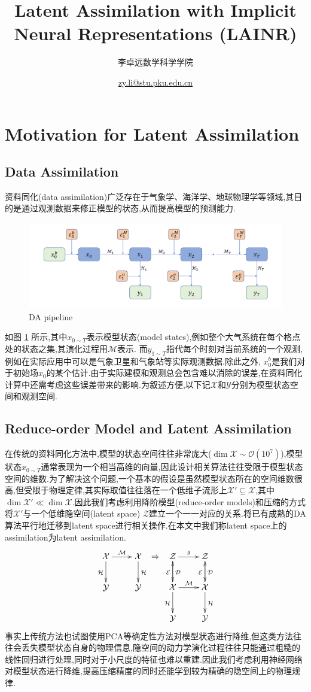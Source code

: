 \documentclass{article}
\title{Latent Assimilation with Implicit Neural Representations (LAINR)}
\author{李卓远\hspace*{5ex}数学科学学院}
\date{\href{mailto:zy.li@stu.pku.edu.cn}{zy.li@stu.pku.edu.cn}}
\newcommand{\mM}{\mathcal{M}}
\newcommand{\mH}{\mathcal{H}}
\newcommand{\mX}{\mathcal{X}}
\newcommand{\mY}{\mathcal{Y}}
\newcommand{\mZ}{\mathcal{Z}}
\newcommand{\mO}{\mathcal{O}}
\newcommand{\mE}{\mathcal{E}}
\newcommand{\mD}{\mathcal{D}}
\begin{document}
\maketitle
\section{Motivation for Latent Assimilation}
\subsection{Data Assimilation}
资料同化(data assimilation)广泛存在于气象学、海洋学、地球物理学等领域,其目的是通过观测数据来修正模型的状态,从而提高模型的预测能力.
\begin{figure}\label{fig:da-pipeline}
	\centering
	\includegraphics[width=.8\textwidth]{figs/4d-var-pipeline.pdf}
	\caption{DA pipeline}
\end{figure}
如图 \ref{fig:da-pipeline} 所示,其中$x_{0\sim T}$表示模型状态(model states),例如整个大气系统在每个格点处的状态之集,其演化过程用$\mM$表示. 而$y_{1\sim T}$指代每个时刻对当前系统的一个观测,例如在实际应用中可以是气象卫星和气象站等实际观测数据.除此之外, $x_0^b$是我们对于初始场$x_0$的某个估计.由于实际建模和观测总会包含难以消除的误差,在资料同化计算中还需考虑这些误差带来的影响.为叙述方便,以下记$\mX$和$\mY$分别为模型状态空间和观测空间.
\subsection{Reduce-order Model and Latent Assimilation}
在传统的资料同化方法中,模型的状态空间往往非常庞大($\dim\mX\sim\mO(10^7)$),模型状态$x_{0\sim T}$通常表现为一个相当高维的向量,因此设计相关算法往往受限于模型状态空间的维数.为了解决这个问题,一个基本的假设是虽然模型状态所在的空间维数很高,但受限于物理定律,其实际取值往往落在一个低维子流形上$\mX'\subseteq\mX$,其中$\dim\mX'\ll\dim\mX$.因此我们考虑利用降阶模型(reduce-order models)和压缩的方式将$\mX'$与一个低维隐空间(latent space) $\mZ$建立一个一一对应的关系.将已有成熟的DA算法平行地迁移到latent space进行相关操作.在本文中我们称latent space上的assimilation为latent assimilation.
\[
	\xymatrix{
		\mX\ar[r]^{\mM}\ar[d]_{\mH}&\mX\ar[d]^{\mH}\\
		\mY&\mY
	}
	\Rightarrow
	\xymatrix{
		\mZ\ar[r]^{g}\ar[d]^{\mD}&\mZ\ar[d]^{\mD}\\
		\mX\ar[u]^{\mE}\ar[r]^{\mM}\ar[d]_{\mH}&\mX\ar[u]^{\mE}\ar[d]^{\mH}\\
		\mY&\mY
	}
\]
事实上传统方法也试图使用PCA等确定性方法对模型状态进行降维,但这类方法往往会丢失模型状态自身的物理信息,隐空间的动力学演化过程往往只能通过粗糙的线性回归进行处理,同时对于小尺度的特征也难以重建.因此我们考虑利用神经网络对模型状态进行降维,提高压缩精度的同时还能学到较为精确的隐空间上的物理规律.
\end{document}
